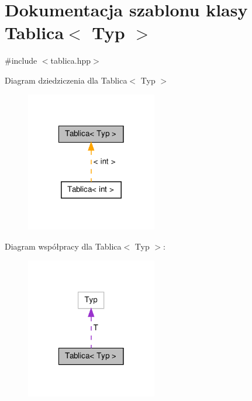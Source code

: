 \hypertarget{class_tablica}{\section{\-Dokumentacja szablonu klasy \-Tablica$<$ \-Typ $>$}
\label{class_tablica}
}


{\ttfamily \#include $<$tablica.\-hpp$>$}



\-Diagram dziedziczenia dla \-Tablica$<$ \-Typ $>$\nopagebreak
\begin{figure}[H]
\begin{center}
\leavevmode
\includegraphics[width=162pt]{class_tablica__inherit__graph}
\end{center}
\end{figure}


\-Diagram współpracy dla \-Tablica$<$ \-Typ $>$\-:\nopagebreak
\begin{figure}[H]
\begin{center}
\leavevmode
\includegraphics[width=162pt]{class_tablica__coll__graph}
\end{center}
\end{figure}
